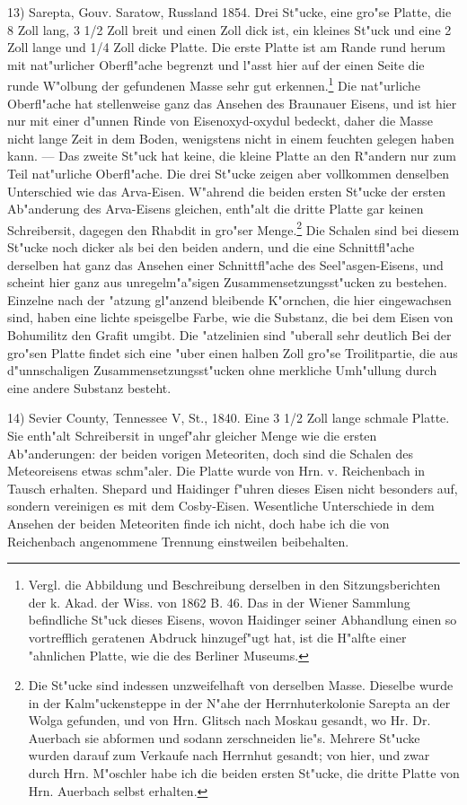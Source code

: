 \documentclass[a4paper, 11pt, oneside]{article}
\begin{document}
13) Sarepta, Gouv. Saratow, Russland 1854. Drei St"ucke, eine gro"se Platte, die 8 Zoll lang, 3 1/2 Zoll breit und einen Zoll dick ist, ein kleines St"uck und eine 2 Zoll lange und 1/4 Zoll dicke Platte. Die erste Platte ist am Rande rund herum mit nat"urlicher Oberfl"ache begrenzt und l"asst hier auf der einen Seite die runde W"olbung der gefundenen Masse sehr gut erkennen.\footnote{Vergl. die Abbildung und Beschreibung derselben in den Sitzungsberichten der k. Akad. der Wiss. von 1862 B. 46. Das in der Wiener Sammlung befindliche St"uck dieses Eisens, wovon Haidinger seiner Abhandlung einen so vortrefflich geratenen Abdruck hinzugef"ugt hat, ist die H"alfte einer "ahnlichen Platte, wie die des Berliner Museums.} Die nat"urliche Oberfl"ache hat stellenweise ganz das Ansehen des Braunauer Eisens, und ist hier nur mit einer d"unnen Rinde von Eisenoxyd-oxydul bedeckt, daher die Masse nicht lange Zeit in dem Boden, wenigstens nicht in einem feuchten gelegen haben kann. --- Das zweite St"uck hat keine, die kleine Platte an den R"andern nur zum Teil nat"urliche Oberfl"ache. Die drei St"ucke zeigen aber vollkommen denselben Unterschied wie das Arva-Eisen. W"ahrend die beiden ersten St"ucke der ersten Ab"anderung des Arva-Eisens gleichen, enth"alt die dritte Platte gar keinen Schreibersit, dagegen den Rhabdit in gro"ser Menge.\footnote{Die St"ucke sind indessen unzweifelhaft von derselben Masse. Dieselbe wurde in der Kalm"uckensteppe in der N"ahe der Herrnhuterkolonie Sarepta an der Wolga gefunden, und von Hrn. Glitsch nach Moskau gesandt, wo Hr. Dr. Auerbach sie abformen und sodann zerschneiden lie"s. Mehrere St"ucke wurden darauf zum Verkaufe nach Herrnhut gesandt; von hier, und zwar durch Hrn. M"oschler habe ich die beiden ersten St"ucke, die dritte Platte von Hrn. Auerbach selbst erhalten.} Die Schalen sind bei diesem St"ucke noch dicker als bei den beiden andern, und die eine Schnittfl"ache derselben hat ganz das Ansehen einer Schnittfl"ache des Seel"asgen-Eisens, und scheint hier ganz aus unregelm"a"sigen Zusammensetzungsst"ucken zu bestehen. Einzelne nach der "atzung gl"anzend bleibende K"ornchen, die hier eingewachsen sind, haben eine lichte speisgelbe Farbe, wie die Substanz, die bei dem Eisen von Bohumilitz den Grafit umgibt. Die "atzelinien sind "uberall sehr deutlich Bei der gro"sen Platte findet sich eine "uber einen halben Zoll gro"se Troilitpartie, die aus d"unnschaligen Zusammensetzungsst"ucken ohne merkliche Umh"ullung durch eine andere Substanz besteht.

14) Sevier County, Tennessee V, St., 1840. Eine 3 1/2 Zoll lange schmale Platte. Sie enth"alt Schreibersit in ungef"ahr gleicher Menge wie die ersten Ab"anderungen: der beiden vorigen Meteoriten, doch sind die Schalen des Meteoreisens etwas schm"aler. Die Platte wurde von Hrn. v. Reichenbach in Tausch erhalten. Shepard und Haidinger f"uhren dieses Eisen nicht besonders auf, sondern vereinigen es mit dem Cosby-Eisen. Wesentliche Unterschiede in dem Ansehen der beiden Meteoriten finde ich nicht, doch habe ich die von Reichenbach angenommene Trennung einstweilen beibehalten.
\end{document}
